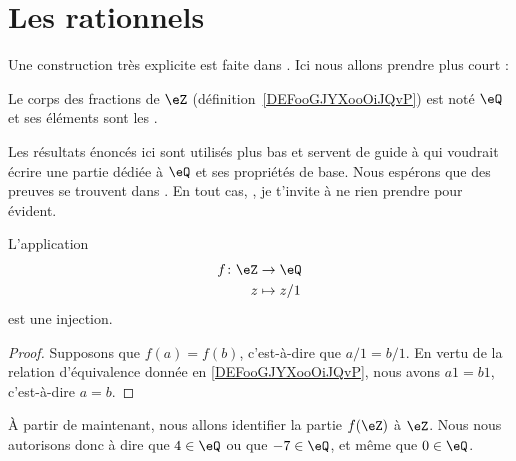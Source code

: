 \section{Les rationnels}

Une construction très explicite est faite dans \cite{RWWJooJdjxEK}. Ici nous allons prendre plus court :
\begin{definition}
    Le corps des fractions de \( \eZ\) (définition~\ref{DEFooGJYXooOiJQvP}) est noté \( \eQ\) et ses éléments sont les .
\end{definition}

\begin{normaltext}
    Les résultats énoncés ici sont utilisés plus bas et servent de guide à  qui voudrait écrire une partie dédiée à \( \eQ\) et ses propriétés de base. Nous espérons que des preuves se trouvent dans \cite{RWWJooJdjxEK}. En tout cas, , je t'invite à ne rien prendre pour évident.
\end{normaltext}

\begin{proposition}     \label{PROPooUULNooKbwuEw}
    L'application 
    \begin{equation}
        \begin{aligned}
            f\colon \eZ&\to \eQ \\
            z&\mapsto z/1 
        \end{aligned}
    \end{equation}
    est une injection.
\end{proposition}

\begin{proof}
    Supposons que \( f(a)=f(b)\), c'est-à-dire que \( a/1=b/1\). En vertu de la relation d'équivalence donnée en \ref{DEFooGJYXooOiJQvP}, nous avons \( a1=b1\), c'est-à-dire \( a=b\).
\end{proof}

\begin{normaltext}
    À partir de maintenant, nous allons identifier la partie \( f(\eZ)\) à \( \eZ\). Nous nous autorisons donc à dire que \( 4\in \eQ\) ou que \( -7\in \eQ\), et même que \( 0\in \eQ\).
\end{normaltext}


